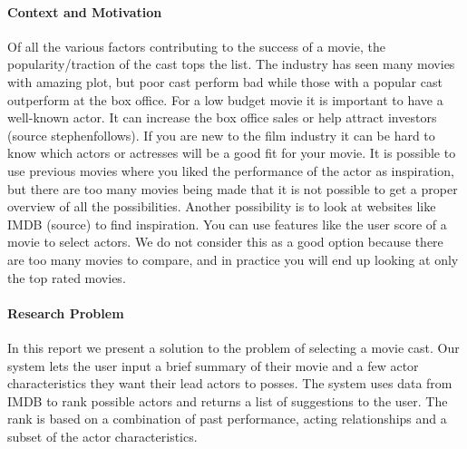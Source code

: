 
\noindent

\paragraph{Context and Motivation}
Of all the various factors contributing to the success of a movie, the popularity/traction of the cast tops the list. 
The industry has seen many movies with amazing plot, but poor cast perform bad while those with a popular cast outperform at the box office. 
For a low budget movie it is important to have a well-known actor. It can increase the box office sales or help attract investors (source stephenfollows).
If you are new to the film industry it can be hard to know which actors or actresses will be a good fit for your movie.
It is possible to use previous movies where you liked the performance of the actor as inspiration, but there are too many movies
being made that it is not possible to get a proper overview of all the possibilities. Another possibility is to look at websites like
IMDB (source) to find inspiration. You can use features like the user score of a movie to select actors. We do not consider this
as a good option because there are too many movies to compare, and in practice you will end up looking at only the top rated movies.

\paragraph{Research Problem}
In this report we present a solution to the problem of selecting a movie cast. Our system lets the user input a brief summary of their
movie and a few actor characteristics they want their lead actors to posses. The system uses data from IMDB to rank possible actors
and returns a list of suggestions to the user. The rank is based on a combination of past performance, acting relationships and
a subset of the actor characteristics. 

